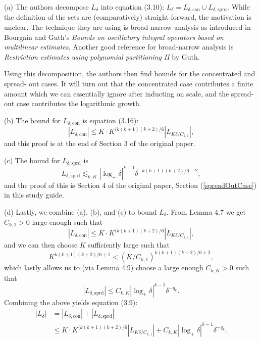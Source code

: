 \documentclass[12pt]{article}
\let\oldref\ref
\renewcommand{\ref}[1]{(\oldref{#1})}
\theoremstyle{definition}
\theoremstyle{remark}
\numberwithin{equation}{section}
\begin{document}
(a) The authors decompose $L_\delta$ into equation (3.10): $L_\delta = L_{\delta,\textrm{con}}\cup L_{\delta,\textrm{sprd}}$. 
While the definition of the sets are (comparatively) straight forward, the motivation is unclear. 
The technique they are using is broad-narrow analysis as introduced in Bourgain and Guth's \textit{Bounds on oscillatory integral operators based on multilinear estimates}. 
Another good reference for broad-narrow analysis is \textit{Restriction estimates using polynomial partitioning II} by Guth.

Using this decomposition, the authors then find bounds for the concentrated and spread- out cases. 
It will turn out that the concentrated case contributes a finite amount which we can essentially ignore after inducting on scale, and the spread-out case contributes the logarithmic growth. 

(b) The bound for $L_{\delta,\textrm{con}}$ is equation (3.16):
$$|L_{\delta,\textrm{con}}| \leq K\cdot K^{(k(k+1)(k+2)/6}|L_{K\delta/C_{k,1}}|,$$
and this proof is at the end of Section 3 of the original paper. 

(c) The bound for $L_{\delta,\textrm{sprd}}$ is 
$$L_{\delta,\textrm{sprd}} \lesssim_{k,K} |\log_+\delta|^{k-1}\delta^{-k(k+1)(k+2)/6-2},$$
and the proof of this is Section 4 of the original paper, Section \ref{spreadOutCase} in this study guide.

(d) Lastly, we combine (a), (b), and (c) to bound $L_\delta$.
From Lemma 4.7 we get $C_{k,1}>0$ large enough such that 
$$|L_{\delta,\textrm{con}}| \leq K\cdot K^{(k(k+1)(k+2)/6}|L_{K\delta/C_{k,1}}|,$$
and we can then choose $K$ sufficiently large such that $$K^{k(k+1)(k+2)/6+1} < (K/C_{k,1})^{k(k+1)(k+2)/6+2},$$
which lastly allows us to (via Lemma 4.9) choose a large enough $C_{k,K}>0$ such that 
$$|L_{\delta,\textrm{sprd}}| \leq C_{k,K}|\log_+\delta|^{k-1}\delta^{-q_k}.$$
Combining the above yields equation (3.9):
\begin{align*}
    |L_\delta| &= |L_{\delta,\textrm{con}}| + |L_{\delta,\textrm{sprd}}| \\
    &\leq K\cdot K^{(k(k+1)(k+2)/6}|L_{K\delta/C_{k,1}}| +C_{k,K}|\log_+\delta|^{k-1}\delta^{-q_k}.
\end{align*}
\end{document}
